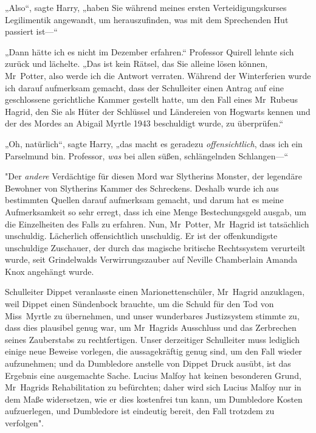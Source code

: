{„Also“, sagte Harry, „haben Sie während meines ersten Verteidigungskurses Legilimentik angewandt, um herauszufinden, was mit dem Sprechenden Hut passiert ist—“

„Dann hätte ich es nicht im Dezember erfahren.“ Professor Quirell lehnte sich zurück und lächelte. „Das ist kein Rätsel, das Sie alleine lösen können, Mr~Potter, also werde ich die Antwort verraten. Während der Winterferien wurde ich darauf aufmerksam gemacht, dass der Schulleiter einen Antrag auf eine geschlossene gerichtliche Kammer gestellt hatte, um den Fall eines Mr~Rubeus Hagrid, den Sie als Hüter der Schlüssel und Ländereien von Hogwarts kennen und der des Mordes an Abigail Myrtle 1943 beschuldigt wurde, zu überprüfen.“

„Oh, natürlich“, sagte Harry, „das macht es geradezu \emph{offensichtlich}, dass ich ein Parselmund bin. Professor, \emph{was} bei allen süßen, schlängelnden Schlangen—“

"Der \emph{andere} Verdächtige für diesen Mord war Slytherins Monster, der legendäre Bewohner von Slytherins Kammer des Schreckens. Deshalb wurde ich aus bestimmten Quellen darauf aufmerksam gemacht, und darum hat es meine Aufmerksamkeit so sehr erregt, dass ich eine Menge Bestechungsgeld ausgab, um die Einzelheiten des Falls zu erfahren. Nun, Mr~Potter, Mr~Hagrid ist tatsächlich unschuldig. Lächerlich offensichtlich unschuldig. Er ist der offenkundigste unschuldige Zuschauer, der durch das magische britische Rechtssystem verurteilt wurde, seit Grindelwalds Verwirrungszauber auf Neville Chamberlain Amanda Knox angehängt wurde.

Schulleiter Dippet veranlasste einen Marionettenschüler, Mr~Hagrid anzuklagen, weil Dippet einen Sündenbock brauchte, um die Schuld für den Tod von Miss~Myrtle zu übernehmen, und unser wunderbares Justizsystem stimmte zu, dass dies plausibel genug war, um Mr~Hagrids Ausschluss und das Zerbrechen seines Zauberstabs zu rechtfertigen. Unser derzeitiger Schulleiter muss lediglich einige neue Beweise vorlegen, die aussagekräftig genug sind, um den Fall wieder aufzunehmen; und da Dumbledore anstelle von Dippet Druck ausübt, ist das Ergebnis eine ausgemachte Sache. Lucius Malfoy hat keinen besonderen Grund, Mr~Hagrids Rehabilitation zu befürchten; daher wird sich Lucius Malfoy nur in dem Maße widersetzen, wie er dies kostenfrei tun kann, um Dumbledore Kosten aufzuerlegen, und Dumbledore ist eindeutig bereit, den Fall trotzdem zu verfolgen".

}
